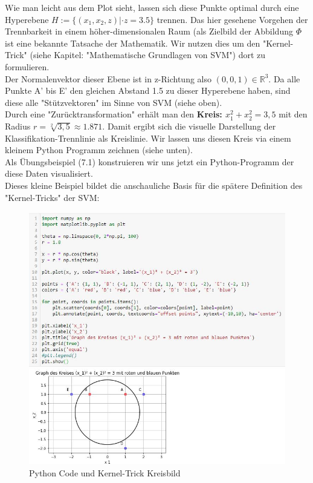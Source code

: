 \documentclass[12pt]{article}
\begin{document}
%
Wie man leicht aus dem Plot sieht, lassen sich diese Punkte optimal durch eine Hyperebene ${H := \lbrace (x_1,x_2,z)| \cdot z=3.5 \rbrace}$ trennen. Das hier gesehene Vorgehen der Trennbarkeit in einem höher-dimensionalen Raum (als Zielbild der Abbildung $ \Phi $ ist eine bekannte Tatsache der Mathematik. Wir nutzen dies um den "Kernel-Trick" (siehe Kapitel: "Mathematische Grundlagen von SVM") dort zu formulieren. \\
Der Normalenvektor dieser Ebene ist in z-Richtung also $(0,0,1) \in \mathbb{R}^3 $. Da alle Punkte A' bis E' den gleichen Abstand 1.5 zu dieser Hyperebene haben, sind diese alle "Stützvektoren" im Sinne von SVM (siehe oben). \\ 
Durch eine "Zurücktransformation" erhält man den \textbf{Kreis: $ x_1^2 + x_2^2=3,5 $ } mit den Radius $r = \sqrt[2]{3,5} \approx 1.871 $.  Damit ergibt sich die visuelle Darstellung der Klassifikation-Trennlinie als Kreislinie. Wir lassen uns diesen Kreis via einem kleinem Python Programm zeichnen (siehe unten). \\
Als Übungsbeispiel (7.1) konstruieren wir uns jetzt ein Python-Programm der diese Daten visualisiert. \\ 
Dieses kleine Beispiel bildet die anschauliche Basis für die spätere Definition des "Kernel-Tricks" der SVM: \\[0.2cm]
\begin{figure}[tp]
  \centering
  \hspace*{-0.1cm} 
  \includegraphics[width=1.1\textwidth]{SVM-Kreisbild-Python}
  \caption{Python Code und Kernel-Trick Kreisbild}       
  \label{fig:SVM_Kreis}
\end{figure}
%
\newpage
\end{document}
